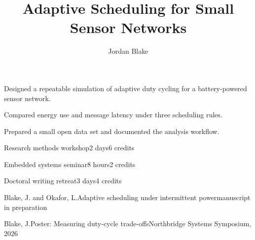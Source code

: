 \documentclass{unitn-bimrep}
\author{Jordan Blake}
\title{Adaptive Scheduling for Small Sensor Networks}
\begin{document}
\begin{research}
  \item Designed a repeatable simulation of adaptive duty cycling for a
  battery-powered sensor network.
  \item Compared energy use and message latency under three scheduling rules.
  \item Prepared a small open data set and documented the analysis workflow.
\end{research}

\begin{school}
  \item{Research methods workshop}{2 days}{6 credits}
  \item{Embedded systems seminar}{8 hours}{2 credits}
  \item{Doctoral writing retreat}{3 days}{4 credits}
\end{school}

\begin{production}
  \item{Blake, J. and Okafor, L.}{Adaptive scheduling under intermittent power}{manuscript in preparation}
  \item{Blake, J.}{Poster: Measuring duty-cycle trade-offs}{Northbridge Systems Symposium, 2026}
\end{production}
\end{document}
